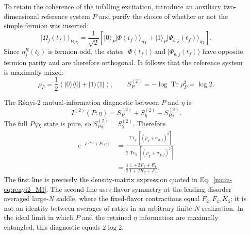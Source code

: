 \documentclass[11pt,a4paper]{article}
\begin{document}
To retain the coherence of the infalling excitation, introduce an auxiliary
two-dimensional reference system \(P\) and purify the choice of whether or
not the simple fermion was inserted:
\begin{equation}
  \lvert\Omega_j(t_f)\rangle_{P\eta\chi}
  =
  \frac{1}{\sqrt{2}}
  \left[
  \lvert0\rangle_P
  \lvert\Phi(t_f)\rangle_{\eta\chi}
  +
  \lvert1\rangle_P
  \lvert\Phi_{b,j}(t_f)\rangle_{\eta\chi}
  \right].
\label{eq:S5-reference-state}
\end{equation}
Since \(\eta^R_j(t_b)\) is fermion odd, the states
\(\lvert\Phi(t_f)\rangle\) and
\(\lvert\Phi_{b,j}(t_f)\rangle\) have opposite fermion parity and are
therefore orthogonal. It follows that the reference system is maximally
mixed:
\begin{equation}
  \rho_P
  =
  \frac{1}{2}
  \left(
  \lvert0\rangle\langle0\rvert
  +
  \lvert1\rangle\langle1\rvert
  \right),
  \qquad
  S_P^{(2)}
  =
  -\log\operatorname{Tr}\rho_P^2
  =
  \log2 .
\label{eq:S5-reference-entropy}
\end{equation}

The R\'enyi-2 mutual-information diagnostic between \(P\) and \(\eta\) is
\begin{equation}
  I^{(2)}(P:\eta)
  =
  S_P^{(2)}
  +
  S_\eta^{(2)}
  -
  S_{P\eta}^{(2)}.
\label{eq:S5-MI-definition}
\end{equation}
The full \(P\eta\chi\) state is pure, so
\(S_{P\eta}^{(2)}=S_\chi^{(2)}\). Therefore
\begin{equation}
\begin{aligned}
  e^{-I^{(2)}(P:\eta)}
  &=
  \frac{
  \operatorname{Tr}_{\eta}
  \left[
  \left(
  \rho_\eta+\sigma_{\eta,j}
  \right)^2
  \right]
  }{
  2\operatorname{Tr}_{\chi}
  \left[
  \left(
  \rho_\chi+\sigma_{\chi,j}
  \right)^2
  \right]
  }
  \\
  &=
  \frac{1}{2}
  \frac{
  1+2F_2+F_4
  }{
  1+2K_2+F_4
  }.
\end{aligned}
\label{eq:S5-MI-ratio}
\end{equation}
The first line is precisely the density-matrix expression quoted in
Eq.~\eqref{main-eq:renyi2_MI}. The second line uses flavor symmetry at the
leading disorder-averaged large-\(N\) saddle, where the fixed-flavor
contractions equal \(F_2,F_4,K_2\); it is not an identity between averages
of ratios in an arbitrary finite-\(N\) realization. In the ideal limit in which \(P\) and the retained
\(\eta\) information are maximally entangled, this diagnostic equals
\(2\log2\).
\end{document}

